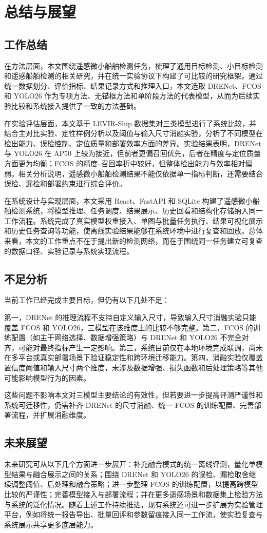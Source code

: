 \section{总结与展望}\label{sec:conclusion}

\subsection{工作总结}

在方法层面，本文围绕遥感微小船舶检测任务，梳理了通用目标检测、小目标检测和遥感船舶检测的相关研究，并在统一实验协议下构建了可比较的研究框架。通过统一数据划分、评价指标、结果记录方式和推理入口，本文选取 DRENet、FCOS 和 YOLO26 作为专项方法、无锚框方法和单阶段方法的代表模型，从而为后续实验比较和系统接入提供了一致的方法基础。

在实验评估层面，本文基于 LEVIR-Ship 数据集对三类模型进行了系统比较，并结合主对比实验、定性样例分析以及阈值与输入尺寸消融实验，分析了不同模型在检出能力、误检控制、定位质量和部署效率方面的差异。实验结果表明，DRENet 与 YOLO26 在 AP50 上较为接近，但前者更偏召回优先，后者在精度与定位质量方面更为均衡；FCOS 的精度--召回率折中较好，但整体检出能力与效率相对偏弱。相关分析说明，遥感微小船舶检测结果不能仅依据单一指标判断，还需要结合误检、漏检和部署约束进行综合评价。

在系统设计与实现层面，本文采用 React、FastAPI 和 SQLite 构建了遥感微小船舶检测系统，将模型推理、任务调度、结果展示、历史回看和结构化存储纳入同一工作流程。系统完成了真实模型权重接入、单图与批量任务执行、结果可视化展示和历史任务查询等功能，使离线实验结果能够在系统环境中进行复查和回放。总体来看，本文的工作重点不在于提出新的检测网络，而在于围绕同一任务建立可复查的数据口径、实验记录与系统实现流程。

\subsection{不足分析}

当前工作已经完成主要目标，但仍有以下几处不足：

第一，DRENet 的推理流程不支持自定义输入尺寸，导致输入尺寸消融实验只能覆盖 FCOS 和 YOLO26，三模型在该维度上的比较不够完整。第二，FCOS 的训练配置（如主干网络选择、数据增强策略）与 DRENet 和 YOLO26 不完全对齐，可能对最终指标产生一定影响。第三，系统目前仅在本地环境完成联调，尚未在多平台或真实部署场景下验证稳定性和跨环境迁移能力。第四，消融实验仅覆盖置信度阈值和输入尺寸两个维度，未涉及数据增强、损失函数和后处理策略等其他可能影响模型行为的因素。

这些问题不影响本文对三模型主要结论的有效性，但若要进一步提高评测严谨性和系统可迁移性，仍需补齐 DRENet 的尺寸消融、统一 FCOS 的训练配置、完善部署流程，并扩展消融维度。

\subsection{未来展望}

未来研究可从以下几个方面进一步展开：补充融合模式的统一离线评测，量化单模型结果与融合展示之间的关系；围绕 DRENet 和 YOLO26 的误检、漏检取舍继续调整阈值、后处理和融合策略；进一步整理 FCOS 的训练配置，以提高跨模型比较的严谨性；完善模型接入与部署流程；并在更多遥感场景和数据集上检验方法与系统的泛化情况。随着上述工作持续推进，现有系统还可进一步扩展为实验管理平台，例如将统一报告导出、批量回评和参数留痕接入同一工作流，使实验复查与系统展示共享更多底层能力。

